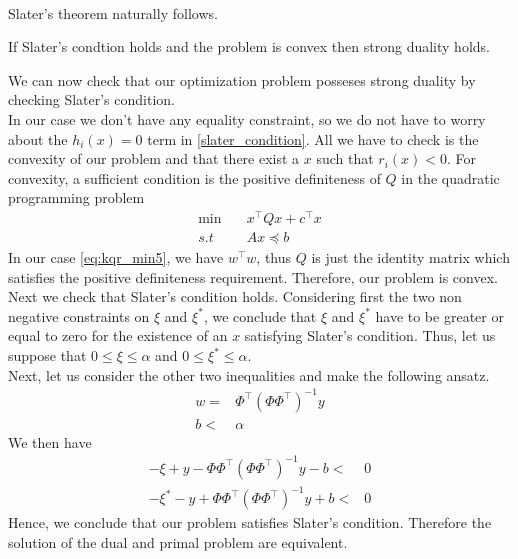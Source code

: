 \\
Slater's theorem naturally follows.
\begin{theorem}
    If Slater's condtion holds and the problem is convex then strong duality holds.
\end{theorem}
We can now check that our optimization problem posseses strong duality by checking Slater's condition.
\\
In our case we don't have any equality constraint, so we do not have to worry about the $h_i(x)=0$ term in \ref{slater_condition}. All we have to check is the convexity of our problem and that there exist a $x$ such that $r_i(x)<0$.
For convexity, a sufficient condition is the positive definiteness of $Q$ in the quadratic programming problem 
\begin{equation}
    \begin{aligned}
        \min \quad & x^\intercal Q x+ c^\intercal x \\        
        s.t \quad& Ax\preceq b
    \end{aligned}
\end{equation}
In our case \ref{eq:kqr_min5}, we have $w^\intercal w$, thus $Q$ is just the identity matrix which satisfies the positive definiteness requirement. Therefore, our problem is convex.
Next we check that Slater's condition holds. Considering first the two non negative constraints on $\xi$ and $\xi^*$, we conclude that $\xi$  and $\xi^*$ have to be greater or equal to zero for the existence of an $x$ satisfying Slater's condition. Thus, let us suppose that $0 \leq \xi \leq \alpha$ and $0 \leq \xi^* \leq \alpha$.
\\
Next, let us consider the other two inequalities and make the following ansatz.
\\
\begin{equation}
    \begin{aligned}
        w=& \Phi^\intercal(\Phi \Phi^\intercal)^{-1} y\\
        b<& \alpha
    \end{aligned}
\end{equation}
We then have
\begin{equation}
    \begin{aligned}
        -\xi + y -\Phi\Phi^\intercal(\Phi \Phi^\intercal)^{-1}y-b<&0
        \\
        -\xi^* - y +\Phi\Phi^\intercal(\Phi \Phi^\intercal)^{-1}y+b<&0
    \end{aligned}
\end{equation}
Hence, we conclude that our problem satisfies Slater's condition. Therefore the solution of the dual and primal problem are equivalent.
